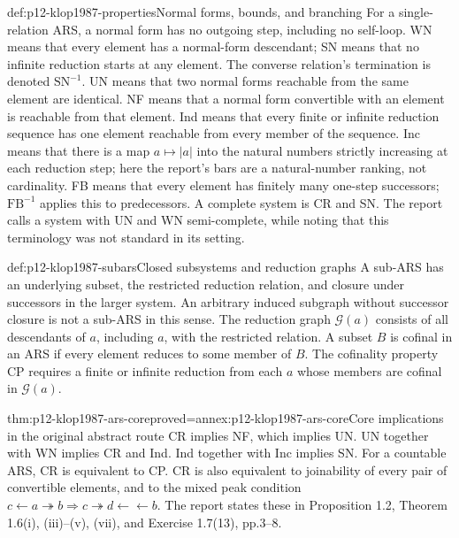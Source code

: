 \begin{hbdefinition}{def:p12-klop1987-properties}{Normal forms, bounds, and branching}
For a single-relation ARS, a normal form has no outgoing step, including
no self-loop. WN means that every element has a normal-form descendant;
SN means that no infinite reduction starts at any element. The converse
relation's termination is denoted \(\mathrm{SN}^{-1}\).
UN means that two normal forms reachable from the same element are identical.
NF means that a normal form convertible with an element is reachable from
that element. Ind means that every finite or infinite reduction sequence has
one element reachable from every member of the sequence.
Inc means that there is a map \(a\mapsto |a|\) into the natural numbers
strictly increasing at each reduction step; here the report's bars are a
natural-number ranking, not cardinality. FB means that every element has
finitely many one-step successors; \(\mathrm{FB}^{-1}\) applies this to
predecessors. A complete system is CR and SN. The report calls a system
with UN and WN semi-complete, while noting that this terminology was not
standard in its setting.
\end{hbdefinition}

\begin{hbdefinition}{def:p12-klop1987-subars}{Closed subsystems and reduction graphs}
A sub-ARS has an underlying subset, the restricted reduction relation, and
closure under successors in the larger system. An arbitrary induced
subgraph without successor closure is not a sub-ARS in this sense.
The reduction graph \(\mathcal G(a)\) consists of all descendants of
\(a\), including \(a\), with the restricted relation. A subset \(B\)
is cofinal in an ARS if every element reduces to some member of \(B\).
The cofinality property CP requires a finite or infinite reduction from
each \(a\) whose members are cofinal in \(\mathcal G(a)\).
\end{hbdefinition}

\begin{hbtheorem}{thm:p12-klop1987-ars-core}{proved=annex:p12-klop1987-ars-core}{Core implications in the original abstract route}
CR implies NF, which implies UN. UN together with WN implies CR and Ind.
Ind together with Inc implies SN. For a countable ARS, CR is equivalent
to CP. CR is also equivalent to joinability of every pair of convertible
elements, and to the mixed peak condition
\(c\leftarrow a\twoheadrightarrow b\Rightarrow
c\twoheadrightarrow d\leftarrow\!\!\leftarrow b\).
The report states these in Proposition 1.2, Theorem 1.6(i), (iii)--(v),
(vii), and Exercise 1.7(13), pp.3--8.
\end{hbtheorem}

